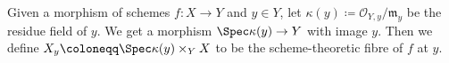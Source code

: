 Given a morphism of schemes $f\colon X\to Y$ and $y \in Y$, let
$\kappa(y)\coloneqq \mathcal{O}_{Y, y}/\mathfrak{m}_y$ be the residue field of $y$.
We get a morphism $\Spec \kappa(y)\to Y$ with image $y$. Then we define $X_y\coloneqq \Spec \kappa(y)\times_{Y} X$
to be the scheme-theoretic fibre of $f$ at $y$.
